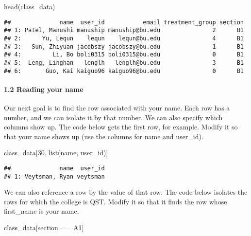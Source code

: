 \documentclass[
]{article}
\newenvironment{Shaded}{\begin{snugshade}}{\end{snugshade}}
\newcommand{\DecValTok}[1]{\textcolor[rgb]{0.00,0.00,0.81}{#1}}
\newcommand{\FunctionTok}[1]{\textcolor[rgb]{0.00,0.00,0.00}{#1}}
\newcommand{\NormalTok}[1]{#1}
\newcommand{\SpecialCharTok}[1]{\textcolor[rgb]{0.00,0.00,0.00}{#1}}
\newcommand{\StringTok}[1]{\textcolor[rgb]{0.31,0.60,0.02}{#1}}
\begin{document}
\begin{Shaded}
\begin{Highlighting}[]
\FunctionTok{head}\NormalTok{(class\_data)}
\end{Highlighting}
\end{Shaded}

\begin{verbatim}
##              name  user_id           email treatment_group section
## 1: Patel, Manushi manuship manuship@bu.edu               2      B1
## 2:      Yu, Lequn    lequn    lequn@bu.edu               4      B1
## 3:   Sun, Zhiyuan jacobszy jacobszy@bu.edu               1      B1
## 4:         Li, Bo boli0315 boli0315@bu.edu               0      B1
## 5:  Leng, Linghan   lenglh   lenglh@bu.edu               3      B1
## 6:       Guo, Kai kaiguo96 kaiguo96@bu.edu               0      B1
\end{verbatim}

\hypertarget{reading-your-name}{%
\paragraph{1.2 Reading your name}\label{reading-your-name}}

Our next goal is to find the row associated with your name. Each row has
a number, and we can isolate it by that number. We can also specify
which columns show up. The code below gets the first row, for example.
Modify it so that your name shows up (use the columns for name and
user\_id).

\begin{Shaded}
\begin{Highlighting}[]
\NormalTok{class\_data[}\DecValTok{30}\NormalTok{, }\FunctionTok{list}\NormalTok{(name, user\_id)]}
\end{Highlighting}
\end{Shaded}

\begin{verbatim}
##              name  user_id
## 1: Veytsman, Ryan veytsman
\end{verbatim}

We can also reference a row by the value of that row. The code below
isolates the rows for which the college is QST. Modify it so that it
finds the row whose first\_name is your name.

\begin{Shaded}
\begin{Highlighting}[]
\NormalTok{class\_data[section }\SpecialCharTok{==} \StringTok{\textquotesingle{}A1\textquotesingle{}}\NormalTok{]}
\end{Highlighting}
\end{Shaded}
\end{document}
